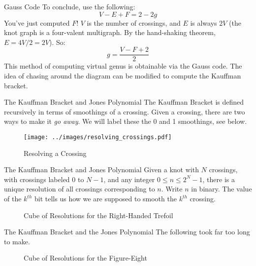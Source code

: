 \documentclass{beamer}
\begin{document}
    \begin{frame}{Gauss Code}
        To conclude, use the following:
        \begin{equation}
            V-E+F=2-2g
        \end{equation}
        You've just computed $F$! $V$ is the number of crossings, and
        $E$ is always $2V$ (the knot graph is a four-valent multigraph. By the
        hand-shaking theorem, $E=4V/2=2V$). So:
        \begin{equation}
            g=\frac{V-F+2}{2}
        \end{equation}
        This method of computing virtual genus is obtainable via the Gauss
        code. The idea of chasing around the diagram can be modified to compute
        the Kauffman bracket.
    \end{frame}
    \begin{frame}{The Kauffman Bracket and Jones Polynomial}
        The Kauffman Bracket is defined recursively in terms of smoothings of a
        crossing. Given a crossing, there are two ways to make it
        \textit{go away}. We will label these the 0 and 1 smoothings, see below.
        \begin{figure}
            \centering
            \texttt{[image: ../images/resolving\_crossings.pdf]}
            \caption{Resolving a Crossing}
            \label{fig:resolving_crossing}
        \end{figure}
    \end{frame}
    \begin{frame}{The Kauffman Bracket and Jones Polynomial}
        Given a knot with $N$ crossings, with crossings labeled 0 to $N-1$,
        and any integer $0\leq{n}\leq{2}^{N}-1$, there is a unique resolution of
        all crossings corresponding to $n$. Write $n$ in binary. The value of
        the $k^{th}$ bit tells us how we are supposed to smooth the $k^{th}$
        crossing.
        \begin{figure}
            \centering
            \caption{Cube of Resolutions for the Right-Handed Trefoil}
            \label{fig:trefoil_knot_cube_of_resolutions}
        \end{figure}
    \end{frame}
    \begin{frame}{The Kauffman Bracket and the Jones Polynomial}
        The following took far too long to make.
        \begin{figure}
            \centering
            \caption{Cube of Resolutions for the Figure-Eight}
            \label{fig:figure_eight_knot_cube_of_resolutions}
        \end{figure}
    \end{frame}
\end{document}
